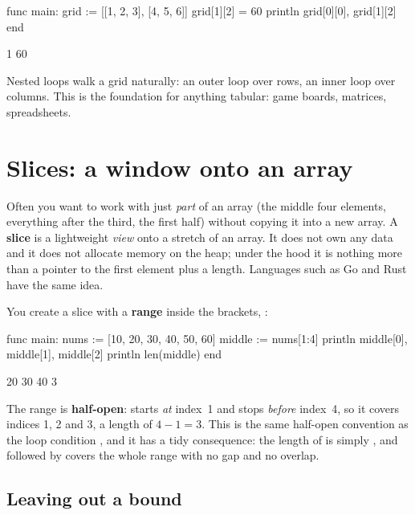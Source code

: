 \begin{salamen}
func main:
    grid := [[1, 2, 3], [4, 5, 6]]
    grid[1][2] = 60
    println grid[0][0], grid[1][2]
end
\end{salamen}

\begin{progout}
1 60
\end{progout}

Nested loops walk a grid naturally: an outer loop over rows, an inner loop over
columns. This is the foundation for anything tabular: game boards, matrices,
spreadsheets.

\section{Slices: a window onto an array}

Often you want to work with just \emph{part} of an array (the middle four
elements, everything after the third, the first half) without copying it into a
new array. A \textbf{slice} is a lightweight \emph{view} onto a stretch of an
array. It does not own any data and it does not allocate memory on the heap;
under the hood it is nothing more than a pointer to the first element plus a
length. Languages such as Go and Rust have the same idea.

You create a slice with a \textbf{range} inside the brackets, :

\begin{salamen}
func main:
    nums := [10, 20, 30, 40, 50, 60]
    middle := nums[1:4]
    println middle[0], middle[1], middle[2]
    println len(middle)
end
\end{salamen}

\begin{progout}
20 30 40
3
\end{progout}

The range is \textbf{half-open}:  starts \emph{at} index~1 and
stops \emph{before} index~4, so it covers indices 1, 2 and 3, a length of
$4-1=3$. This is the same half-open convention as the loop condition
, and it has a tidy consequence: the length of 
is simply , and  followed by  covers
the whole range with no gap and no overlap.

\subsection{Leaving out a bound}

